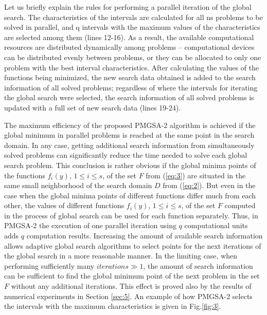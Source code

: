 \documentclass[review]{elsarticle}
\begin{document}
Let us briefly explain the rules for performing a parallel iteration of the global search. The characteristics of the intervals are calculated for all ns problems to be solved in parallel, and q intervals with the maximum values of the characteristics are selected among them (lines 12-16). As a result, the available computational resources are distributed dynamically among problems -- computational devices can be distributed evenly between problems, or they can be allocated to only one problem with the best interval characteristics. After calculating the values of the functions being minimized, the new search data obtained is added to the search information of all solved problems; regardless of where the intervals for iterating the global search were selected, the search information of all solved problems is updated with a full set of new search data (lines 19-24).

The maximum efficiency of the proposed PMGSA-2 algorithm is achieved if the global minimum in parallel problems is reached at the same point in the search domain. In any case, getting additional search information from simultaneously solved problems can significantly reduce the time needed to solve each global search problem. This conclusion is rather obvious if the global minima points of the functions $f_i (y)$, $1 \leq i \leq s$, of the set $F$ from (\ref{eq:3}) are situated in the same small neighborhood of the search domain $D$ from (\ref{eq:2}). But even in the case when the global minima points of different functions differ much from each other, the values of different functions $f_i (y)$, $1 \leq i \leq s$, of the set $F$ computed in the process of global search can be used for each function separately. Thus, in PMGSA-2 the execution of one parallel iteration using $q$ computational units adds $q$ computation results. Increasing the amount of available search information allows adaptive global search algorithms to select points for the next iterations of the global search in a more reasonable manner. In the limiting case, when performing sufficiently many $iterations \gg 1$, the amount of search information can be sufficient to find the global minimum point of the next problem in the set $F$ without any additional iterations. This effect is proved also by the results of numerical experiments in Section \ref{sec:5}. An example of how PMGSA-2 selects the intervals with the maximum characteristics is given in Fig.\ref{fig:3}.
\end{document}
